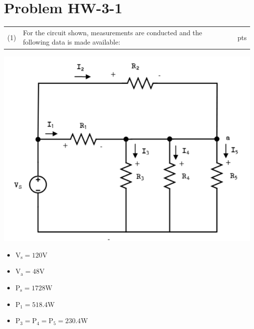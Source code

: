 \documentclass{article}
\newcommand{\problemstatement}[3]{
\noindent
\begin{tabular}{ m{0.5cm} m{42em} m{0.5cm} }
	({#1}) & {#2} & {#3}pts
\end{tabular}
}
\begin{document}
\section{Problem HW-3-1}
\problemstatement{1}{For the circuit shown, measurements are conducted and the following data
is made available:}{}
\includegraphics[width=\textwidth]{problem_3_figure}
\begin{itemize}
	\item $\text{V}_\text{s} = 120 \text{V}$
	\item $\text{V}_\text{a} = 48 \text{V}$
	\item $\text{P}_\text{s} = 1728 \text{W}$
	\item $\text{P}_\text{1} = 518.4 \text{W}$
	\item $\text{P}_\text{3} = \text{P}_\text{4} = \text{P}_\text{5} = 230.4 \text{W}$
\end{itemize}
\end{document}
